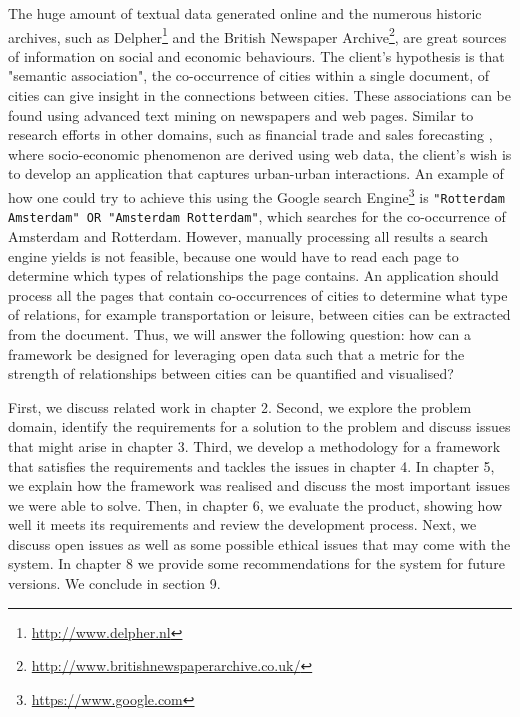 The huge amount of textual data generated online and the numerous historic archives, such as Delpher\footnote{\url{http://www.delpher.nl}} and the British Newspaper Archive\footnote{\url{http://www.britishnewspaperarchive.co.uk/}}, are great sources of information on social and economic behaviours. The client's hypothesis is that "semantic association", the co-occurrence of cities within a single document, of cities can give insight in the connections between cities. These associations can be found using advanced text mining on newspapers and web pages. Similar to research efforts in other domains, such as financial trade \cite{preis2013quantifying} and sales forecasting \cite{wu2014future}, where socio-economic phenomenon are derived using web data, the client's wish is to develop an application that captures urban-urban interactions. An example of how one could try to achieve this using the Google search Engine\footnote{\url{https://www.google.com}} is \texttt{"Rotterdam Amsterdam" OR "Amsterdam Rotterdam"}, which searches for the co-occurrence of Amsterdam and Rotterdam. However, manually processing all results a search engine yields is not feasible, because one would have to read each page to determine which types of relationships the page contains. An application should process all the pages that contain co-occurrences of cities to determine what type of relations, for example transportation or leisure, between cities can be extracted from the document. Thus, we will answer the following question: 
how can a framework be designed for leveraging open data such that a metric for the strength of relationships between cities can be quantified and visualised?

First, we discuss related work in chapter 2. Second, we explore the problem domain, identify the requirements for a solution to the problem and discuss issues that might arise in chapter 3. Third, we develop a methodology for a framework that satisfies the requirements and tackles the issues in chapter 4. In chapter 5, we explain how the framework was realised and discuss the most important issues we were able to solve. Then, in chapter 6, we evaluate the product, showing how well it meets its requirements and review the development process. Next, we discuss open issues as well as some possible ethical issues that may come with the system. In chapter 8 we provide some recommendations for the system for future versions. We conclude in section 9.

